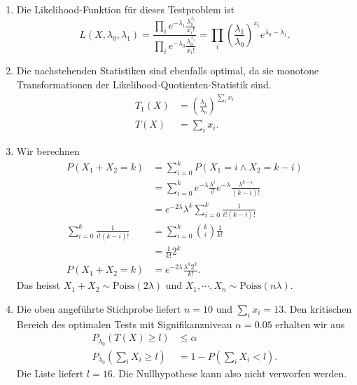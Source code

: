 \solution
\begin{enumerate}
    
    \item Die Likelihood-Funktion für dieses Testproblem ist 
        \begin{equation*}
            L(X, \lambda_0, \lambda_1) = \frac{\prod_i e^{-\lambda_1} \frac{\lambda_1^{x_i}}{x_i!}}
            {\prod_i e^{-\lambda_0} \frac{\lambda_0^{x_i}}{x_i!}} =
            \prod_i \left(  \frac{\lambda_1}{\lambda_0} \right)^{x_i} e^{\lambda_0 - \lambda_1}.
        \end{equation*}

    \item Die nachstehenden Statistiken sind ebenfalls optimal, da sie monotone Transformationen der
        Likelihood-Quotienten-Statistik sind.
        \begin{align*}
            T_1(X) &= \left( \frac{\lambda_1}{\lambda_0} \right)^{\sum_{i}^{} x_i} \\
            T (X) &= \sum_{i}^{} x_i.
        \end{align*}
    
    \item Wir berechnen
        \begin{align*}
            P \left( X_1+X_2 = k \right) &= \sum_{i=0}^{k} P \left( X_1=i \wedge X_2 = k-i \right) \\
            &= \sum_{i=0}^{k} e^{-\lambda} \frac{\lambda^i}{i!} e^{-\lambda} \frac{\lambda^{k-i}}{(k-i)!} \\
            &= e^{-2\lambda} \lambda^k \sum_{i=0}^{k} \frac{1}{i! (k-i)!} \\
            \sum_{i=0}^{k} \frac{1}{i! (k-i)!} &= \sum_{i=0}^{k} \binom{k}{i} \frac{1}{k!} \\
            &= \frac{1}{k!} 2^k \\
            P \left( X_1+X_2 = k \right) &= e^{-2\lambda} \frac{ \lambda^k 2^k   }{k!}. 
        \end{align*}
        Das heisst $X_1+X_2\sim\text{Poiss}(2\lambda)$ und $X_1, \cdots, X_n
        \sim \text{Poiss}(n\lambda)$.

    \item Die oben angeführte Stichprobe liefert $n=10$ und $\sum_{i}^{} x_i =
        13$. Den kritischen Bereich des optimalen Tests mit Signifikanzniveau
        $\alpha=0.05$ erhalten wir aus
        \begin{align*}
            P_{\lambda_0} \left( T(X) \geq l \right) & \leq \alpha \\
            P_{\lambda_0} \left( \sum_{i}^{} X_i \geq l \right) 
            &= 1 - P\left( \sum_{i}^{} X_i < l \right).
        \end{align*}
        Die Liste liefert $l=16$. Die Nullhypothese kann also nicht verworfen werden.

\end{enumerate}




